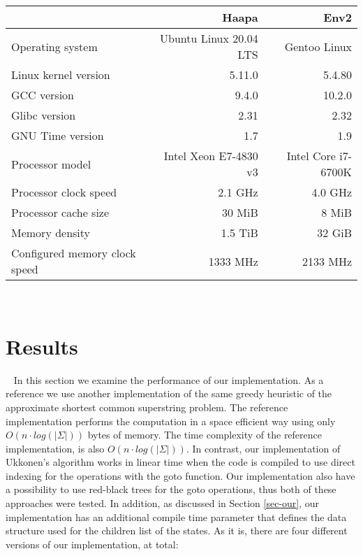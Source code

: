 \documentclass[english,twoside,censored,csm,algorithms-track-2020]{HYthesisML}
\theoremstyle{plain}
\theoremstyle{definition}
\begin{document}
\begin{tabular}{l|r|r}
  & \textbf{Haapa} & \textbf{Env2} \\
  \hline
  Operating system & Ubuntu Linux 20.04 LTS & Gentoo Linux \\
  Linux kernel version & 5.11.0 & 5.4.80 \\
  GCC version & 9.4.0 & 10.2.0 \\
  Glibc version & 2.31 & 2.32 \\
  GNU Time version & 1.7 & 1.9 \\
  \hline
  Processor model & Intel Xeon E7-4830 v3 & Intel Core i7-6700K \\
  Processor clock speed & 2.1 GHz & 4.0 GHz \\
  Processor cache size & 30 MiB & 8 MiB \\
  Memory density & 1.5 TiB & 32 GiB \\
  Configured memory clock speed & 1333 MHz & 2133 MHz \\
\end{tabular}
\\




\section{Results}~\label{sec-results}
In this section we examine the performance of our implementation. As a reference we use another
implementation of the same greedy heuristic of the approximate shortest common superstring problem.
The reference implementation \citep{Alanko19} performs the computation in a space efficient way using
only $O(n \cdot log(|\Sigma|))$ bytes of memory. The time complexity of the reference implementation,
is also $O(n \cdot log(|\Sigma|))$. In contrast, our implementation of Ukkonen's algorithm
works in linear time when the code is compiled to use direct indexing for the operations with
the goto function. Our implementation also have a possibility to use red-black trees for the goto
operations, thus both of these approaches were tested.
In addition, as discussed in Section
\ref{sec-our}, our implementation has an additional compile time parameter that defines the data
structure used for the children list of the states. As it is, there are four different versions of
our implementation, at total:
\end{document}
